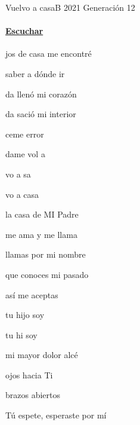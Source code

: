 \documentclass[12pt, spanish]{book}
\begin{document}
    \begin{song}{Vuelvo a casa}{B}
        {2021} %
        {Generación 12}
        {} %
        {}
        \ifChordBk
        \paragraph{\mbox{}\hfill\protect\href{https://open.spotify.com/intl-es/track/7nqC732TB0VnUl2JCUAxXj}{Escuchar}\mbox{}\hfill}
        \fi


        \begin{SBOpGroup}
            jos de casa me encontré

             saber a dónde ir

            da llenó mi corazón

            da sació mi interior

            ceme   error

            dame  vol a 
        \end{SBOpGroup}

        \begin{SBChorus}
            vo a sa

            vo a casa

             la casa de MI Padre

             me ama y me llama

             llamas por mi nombre

            que conoces mi pasado

             así me aceptas

             tu hijo soy

             tu hi soy
        \end{SBChorus}

        \begin{SBOpGroup}
             mi mayor dolor alcé

             ojos hacia Ti

             brazos abiertos

            Tú espete, esperaste por mí


\end{SBOpGroup}
\end{song}
\end{document}
